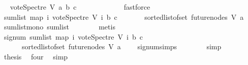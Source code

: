 \begin{isabellebody}
\ \isamarkupfalse%
\ {\isachardoublequoteopen}vote{\isacharunderscore}{\kern0pt}Spectre\ V\ a{}\ b\ c\ \ {\isasymge}\ {}{\isachardoublequoteclose}\isanewline
\ \ \ \ \ \ \ \ \isamarkupfalse%
\ fastforce\isanewline
\ \ \ \ \isamarkupfalse%
\ \isanewline
\ \ \ \ \isamarkupfalse%
\ \isamarkupfalse%
\ {\isachardoublequoteopen}{\isacharparenleft}{\kern0pt}sum{\isacharunderscore}{\kern0pt}list\ {\isacharparenleft}{\kern0pt}map\ {\isacharparenleft}{\kern0pt}{\isasymlambda}i{\isachardot}{\kern0pt}\ vote{\isacharunderscore}{\kern0pt}Spectre\ V\ i\ b\ c{\isacharparenright}{\kern0pt}\ \isanewline
\ \ \ \ \ \ {\isacharparenleft}{\kern0pt}sorted{\isacharunderscore}{\kern0pt}list{\isacharunderscore}{\kern0pt}of{\isacharunderscore}{\kern0pt}set\ {\isacharparenleft}{\kern0pt}future{\isacharunderscore}{\kern0pt}nodes\ V\ a{\isacharparenright}{\kern0pt}{\isacharparenright}{\kern0pt}{\isacharparenright}{\kern0pt}{\isacharparenright}{\kern0pt}\ {\isasymge}\ {}{\isachardoublequoteclose}\ \isamarkupfalse%
\ sum{\isacharunderscore}{\kern0pt}list{\isacharunderscore}{\kern0pt}mono\ sum{\isacharunderscore}{\kern0pt}list{\isacharunderscore}{\kern0pt}{}\isanewline
\ \ \ \ \ \ \isamarkupfalse%
\ metis\ \isanewline
\ \ \ \ \isamarkupfalse%
\ \isamarkupfalse%
\ {\isachardoublequoteopen}signum\ {\isacharparenleft}{\kern0pt}sum{\isacharunderscore}{\kern0pt}list\ {\isacharparenleft}{\kern0pt}map\ {\isacharparenleft}{\kern0pt}{\isasymlambda}i{\isachardot}{\kern0pt}\ vote{\isacharunderscore}{\kern0pt}Spectre\ V\ i\ b\ c{\isacharparenright}{\kern0pt}\ \isanewline
\ \ \ \ \ \ {\isacharparenleft}{\kern0pt}sorted{\isacharunderscore}{\kern0pt}list{\isacharunderscore}{\kern0pt}of{\isacharunderscore}{\kern0pt}set\ {\isacharparenleft}{\kern0pt}future{\isacharunderscore}{\kern0pt}nodes\ V\ a{\isacharparenright}{\kern0pt}{\isacharparenright}{\kern0pt}{\isacharparenright}{\kern0pt}{\isacharparenright}{\kern0pt}\ {\isasymin}\ {\isacharbraceleft}{\kern0pt}{}{\isacharcomma}{\kern0pt}{}{\isacharbraceright}{\kern0pt}{\isachardoublequoteclose}\ \isamarkupfalse%
\ signum{\isachardot}{\kern0pt}simps\isanewline
\ \ \ \ \ \ \isamarkupfalse%
\ simp\ \isanewline
\ \ \ \ \isamarkupfalse%
\ \isamarkupfalse%
\ {\isacharquery}{\kern0pt}thesis\ \isamarkupfalse%
\ four\ \isamarkupfalse%
\ simp\ \isanewline

\end{isabellebody}
